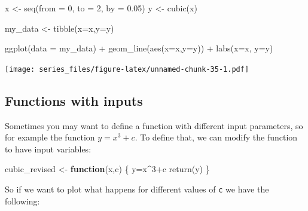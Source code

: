 \documentclass[
]{book}
\newenvironment{Shaded}{\begin{snugshade}}{\end{snugshade}}
\newcommand{\AttributeTok}[1]{\textcolor[rgb]{0.77,0.63,0.00}{#1}}
\newcommand{\ControlFlowTok}[1]{\textcolor[rgb]{0.13,0.29,0.53}{\textbf{#1}}}
\newcommand{\DecValTok}[1]{\textcolor[rgb]{0.00,0.00,0.81}{#1}}
\newcommand{\FloatTok}[1]{\textcolor[rgb]{0.00,0.00,0.81}{#1}}
\newcommand{\FunctionTok}[1]{\textcolor[rgb]{0.00,0.00,0.00}{#1}}
\newcommand{\NormalTok}[1]{#1}
\newcommand{\OtherTok}[1]{\textcolor[rgb]{0.56,0.35,0.01}{#1}}
\newcommand{\SpecialCharTok}[1]{\textcolor[rgb]{0.00,0.00,0.00}{#1}}
\newcommand{\StringTok}[1]{\textcolor[rgb]{0.31,0.60,0.02}{#1}}
\theoremstyle{definition}
\theoremstyle{definition}
\theoremstyle{definition}
\theoremstyle{remark}
\begin{document}
\begin{Shaded}
\begin{Highlighting}[]
\NormalTok{x }\OtherTok{\textless{}{-}} \FunctionTok{seq}\NormalTok{(}\AttributeTok{from =} \DecValTok{0}\NormalTok{, }\AttributeTok{to =} \DecValTok{2}\NormalTok{, }\AttributeTok{by =} \FloatTok{0.05}\NormalTok{)}
\NormalTok{y }\OtherTok{\textless{}{-}} \FunctionTok{cubic}\NormalTok{(x)}

\NormalTok{my\_data }\OtherTok{\textless{}{-}} \FunctionTok{tibble}\NormalTok{(}\AttributeTok{x=}\NormalTok{x,}\AttributeTok{y=}\NormalTok{y)}

\FunctionTok{ggplot}\NormalTok{(}\AttributeTok{data =}\NormalTok{ my\_data) }\SpecialCharTok{+}
  \FunctionTok{geom\_line}\NormalTok{(}\FunctionTok{aes}\NormalTok{(}\AttributeTok{x=}\NormalTok{x,}\AttributeTok{y=}\NormalTok{y)) }\SpecialCharTok{+}
  \FunctionTok{labs}\NormalTok{(}\AttributeTok{x=}\StringTok{\textquotesingle{}x\textquotesingle{}}\NormalTok{,}
         \AttributeTok{y=}\StringTok{\textquotesingle{}y\textquotesingle{}}\NormalTok{)}
\end{Highlighting}
\end{Shaded}

\texttt{[image: series\_files/figure-latex/unnamed-chunk-35-1.pdf]}

\hypertarget{functions-with-inputs}{%
\subsection{Functions with inputs}\label{functions-with-inputs}}

Sometimes you may want to define a function with different input parameters, so for example the function \(y=x^{3}+c\). To define that, we can modify the function to have input variables:

\begin{Shaded}
\begin{Highlighting}[]
\NormalTok{cubic\_revised }\OtherTok{\textless{}{-}} \ControlFlowTok{function}\NormalTok{(x,c) \{}
\NormalTok{  y}\OtherTok{=}\NormalTok{x}\SpecialCharTok{\^{}}\DecValTok{3}\SpecialCharTok{+}\NormalTok{c}
  \FunctionTok{return}\NormalTok{(y)}
\NormalTok{\}}
\end{Highlighting}
\end{Shaded}

So if we want to plot what happens for different values of \texttt{c} we have the following:
\end{document}
